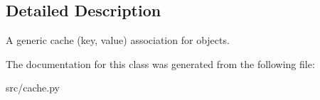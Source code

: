 \subsection{\-Detailed \-Description}
\begin{DoxyVerb}
A generic cache (key, value) association for objects.
\end{DoxyVerb}
 

\-The documentation for this class was generated from the following file\-:\begin{DoxyCompactItemize}
\item 
src/cache.\-py\end{DoxyCompactItemize}
